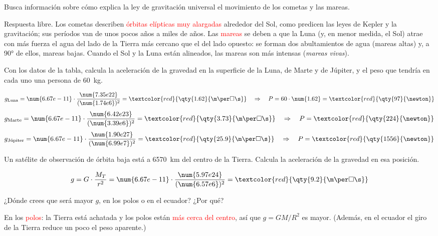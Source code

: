 \begin{exercise}
    Busca información sobre cómo explica la ley de gravitación universal el movimiento de los cometas y las mareas.
    \begin{solu}
        Respuesta libre. Los cometas describen \textcolor{red}{órbitas elípticas muy alargadas} alrededor del Sol, como predicen las leyes de Kepler y la gravitación; sus períodos van de unos pocos años a miles de años. Las \textcolor{red}{mareas} se deben a que la Luna (y, en menor medida, el Sol) atrae con más fuerza el agua del lado de la Tierra más cercano que el del lado opuesto: se forman dos abultamientos de agua (mareas altas) y, a \ang{90} de ellos, mareas bajas. Cuando el Sol y la Luna están alineados, las mareas son más intensas (\emph{mareas vivas}).
    \end{solu}
\end{exercise}

\begin{exercise}
    Con los datos de la tabla, calcula la aceleración de la gravedad en la superficie de la Luna, de Marte y de Júpiter, y el peso que tendría en cada uno una persona de \qty{60}{\kg}.
    \begin{solu}
        \[ g_{\text{Luna}} = \num{6.67e-11} \cdot \frac{\num{7.35e22}}{(\num{1.74e6})^2} = \textcolor{red}{\qty{1.62}{\m\per\square\s}} \quad\Rightarrow\quad P = 60 \cdot \num{1.62} = \textcolor{red}{\qty{97}{\newton}} \]
        \[ g_{\text{Marte}} = \num{6.67e-11} \cdot \frac{\num{6.42e23}}{(\num{3.39e6})^2} = \textcolor{red}{\qty{3.73}{\m\per\square\s}} \quad\Rightarrow\quad P = \textcolor{red}{\qty{224}{\newton}} \]
        \[ g_{\text{Júpiter}} = \num{6.67e-11} \cdot \frac{\num{1.90e27}}{(\num{6.99e7})^2} = \textcolor{red}{\qty{25.9}{\m\per\square\s}} \quad\Rightarrow\quad P = \textcolor{red}{\qty{1556}{\newton}} \]
    \end{solu}
\end{exercise}

\begin{exercise}
    Un satélite de observación de órbita baja está a \qty{6570}{\km} del centro de la Tierra. Calcula la aceleración de la gravedad en esa posición.
    \begin{solu}
        \[ g = G \cdot \frac{M_T}{r^2} = \num{6.67e-11} \cdot \frac{\num{5.97e24}}{(\num{6.57e6})^2} = \textcolor{red}{\qty{9.2}{\m\per\square\s}} \]
    \end{solu}
\end{exercise}

\begin{exercise}
    ¿Dónde crees que será mayor \(g\), en los polos o en el ecuador? ¿Por qué?
    \begin{solu}
        En los \textcolor{red}{polos}: la Tierra está achatada y los polos están \textcolor{red}{más cerca del centro}, así que \(g = GM/R^2\) es mayor. (Además, en el ecuador el giro de la Tierra reduce un poco el peso aparente.)
    \end{solu}
\end{exercise}

